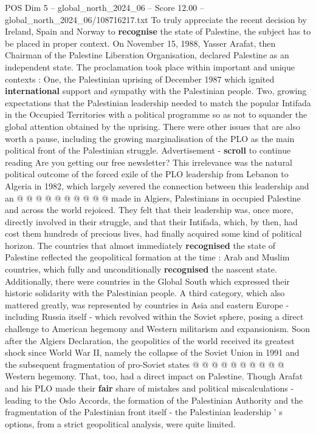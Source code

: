 \begin{textsample}{POS Dim 5 – global\_north\_2024\_06 – Score 12.00 – global\_north\_2024\_06/108716217.txt}  \label{ex:f5_pos_376}
To truly appreciate the recent decision by Ireland, Spain and Norway to \textbf{recognise} the state of Palestine, the subject has to be placed in proper context.
On November 15, 1988, Yasser Arafat, then Chairman of the Palestine Liberation Organisation, declared Palestine as an independent state.
The proclamation took place within important and unique contexts : One, the Palestinian uprising of December 1987 which ignited \textbf{international} support and sympathy with the Palestinian people.
Two, growing expectations that the Palestinian leadership needed to match the popular Intifada in the Occupied Territories with a political programme so as not to squander the global attention obtained by the uprising.
There were other issues that are also worth a pause, including the growing marginalisation of the PLO as the main political front of the Palestinian struggle.
Advertisement - \textbf{scroll} to continue reading Are you getting our free newsletter?
This irrelevance was the natural political outcome of the forced exile of the PLO leadership from Lebanon to Algeria in 1982, which largely severed the connection between this leadership and an @ @ @ @ @ @ @ @ @ @ made in Algiers, Palestinians in occupied Palestine and across the world rejoiced.
They felt that their leadership was, once more, directly involved in their struggle, and that their Intifada, which, by then, had cost them hundreds of precious lives, had finally acquired some kind of political horizon.
The countries that almost immediately \textbf{recognised} the state of Palestine reflected the geopolitical formation at the time : Arab and Muslim countries, which fully and unconditionally \textbf{recognised} the nascent state.
Additionally, there were countries in the Global South which expressed their historic solidarity with the Palestinian people.
A third category, which also mattered greatly, was represented by countries in Asia and eastern Europe - including Russia itself - which revolved within the Soviet sphere, posing a direct challenge to American hegemony and Western militarism and expansionism.
Soon after the Algiers Declaration, the geopolitics of the world received its greatest shock since World War II, namely the collapse of the Soviet Union in 1991 and the subsequent fragmentation of pro-Soviet states @ @ @ @ @ @ @ @ @ @ Western hegemony.
That, too, had a direct impact on Palestine.
Though Arafat and his PLO made their \textbf{fair} share of mistakes and political miscalculations - leading to the Oslo Accords, the formation of the Palestinian Authority and the fragmentation of the Palestinian front itself - the Palestinian leadership ' s options, from a strict geopolitical analysis, were quite limited.

\end{textsample}
